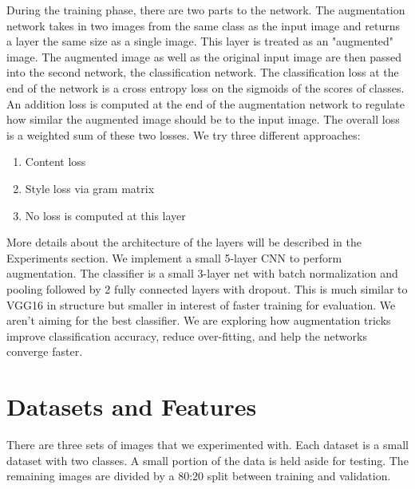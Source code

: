 \documentclass[10pt,twocolumn,letterpaper]{article}
\begin{document}
During the training phase, there are two parts to the network. The augmentation network takes in two images from the same class as the input image and returns a layer the same size as a single image. This layer is treated as an "augmented" image. The augmented image as well as the original input image are then passed into the second network, the classification network. The classification loss at the end of the network is a cross entropy loss on the sigmoids of the scores of classes. An addition loss is computed at the end of the augmentation network to regulate how similar the augmented image should be to the input image. The overall loss is a weighted sum of these two losses. We try three different approaches: 
\begin{enumerate}
\item Content loss 
\item Style loss via gram matrix 
\item No loss is computed at this layer
\end{enumerate}

More details about the architecture of the layers will be described in the Experiments section. We implement a small 5-layer CNN to perform augmentation. The classifier is a small 3-layer net with batch normalization and pooling followed by 2 fully connected layers with dropout. This is much similar to VGG16 in structure but smaller in interest of faster training for evaluation. We aren't aiming for the best classifier. We are exploring how augmentation tricks improve classification accuracy, reduce over-fitting, and help the networks converge faster. 

\section{Datasets and Features}

There are three sets of images that we experimented with. Each dataset is a small dataset with two classes. A small portion of the data is held aside for testing. The remaining images are divided by a 80:20 split between training and validation. \\
\end{document}
